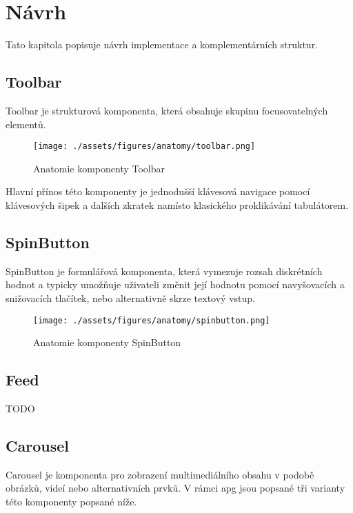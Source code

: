 \chapter{Návrh}

Tato kapitola popisuje návrh implementace a komplementárních struktur.

\section{Toolbar}

Toolbar je strukturová komponenta, která obsahuje skupinu focusovatelných elementů.

\begin{figure}[htp]
    \centering
    \texttt{[image: ./assets/figures/anatomy/toolbar.png]}
    \captionsetup{justification=centering}
    \caption{Anatomie komponenty Toolbar}
\end{figure}

Hlavní přínos této komponenty je jednodušší klávesová navigace pomocí klávesových šipek a dalších zkratek namísto klasického proklikávání tabulátorem.

\section{SpinButton}

SpinButton je formulářová komponenta, která vymezuje rozsah diskrétních hodnot a typicky umožňuje uživateli změnit její hodnotu pomocí navyšovacích a snižovacích tlačítek, nebo alternativně skrze textový vstup.

\begin{figure}[htp]
    \centering
    \texttt{[image: ./assets/figures/anatomy/spinbutton.png]}
    \captionsetup{justification=centering}
    \caption{Anatomie komponenty SpinButton}
\end{figure}

\section{Feed}

TODO

\section{Carousel}

Carousel je komponenta pro zobrazení multimediálního obsahu v podobě obrázků, videí nebo alternativních prvků.
V rámci \gls{apg} jsou popsané tři varianty této komponenty popsané níže.

